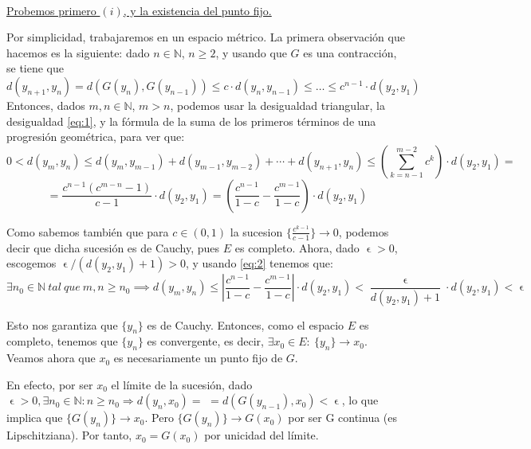 \documentclass[11pt, a4paper, titlepage]{article}
\makeatletter
\let\epsilon\upvarepsilon
\renewenvironment{proof}[1][\proofname] {\vspace{-15pt}\par\pushQED{\qed}\normalfont\topsep6\p@\@plus6\p@\relax\trivlist\item[\hskip\labelsep\it#1\@addpunct{.}]\ignorespaces}{\popQED\endtrivlist\@endpefalse}
\theoremstyle{theorem-style}
\theoremstyle{definition-style}
\theoremstyle{remark-style}
\theoremstyle{example-style}
\makeatother
\begin{document}
\begin{proof} \hfill \\
\underline{Probemos primero $(i)$, y la existencia del punto fijo.} 

Por simplicidad, trabajaremos en un espacio métrico. La primera observación que hacemos es la siguiente: dado $n \in \mathbb{N}$, $n \ge 2$, y usando que $G$ es una contracción, se tiene que
\begin{equation} \label{eq:1} \tag{$\ast$}
d(y_{n+1}, y_{n}) = d(G(y_{n}), G(y_{n-1})) \le c\cdot d(y_{n}, y_{n-1}) \le \dots \le c^{n-1}\cdot d(y_{2}, y_{1})
\end{equation}
Entonces, dados $m,n \in \mathbb{N}$, $m > n$, podemos usar la desigualdad triangular, la desigualdad \eqref{eq:1}, y la fórmula de la suma de los primeros términos de una progresión geométrica, para ver que:
$$0 < d(y_{m}, y_{n}) \leq d(y_m,y_{m-1}) + d(y_{m-1},y_{m-2}) + \cdots + d(y_ {n+1},y_{n})  \leq \left( \sum_{k=n-1}^{m-2}c^k \right) \cdot d(y_2,y_1) = $$ 
\begin{equation} \label{eq:2} \tag{$\ast \ast$}
= \frac{c^{n-1}(c^{m-n} - 1)}{c-1} \cdot d(y_2,y_1) = \left( \frac{c^{n-1}}{1-c} - \frac{c^{m-1}}{1-c} \right) \cdot d(y_2,y_1)
\end{equation}

Como sabemos también que para $c \in (0,1)$ la sucesion $\{\frac{c^{k-1}}{c-1}\} \rightarrow 0$, podemos decir que dicha sucesión es de Cauchy, pues $E$ es completo. Ahora, dado $\epsilon > 0$, escogemos $\epsilon / (d(y_2,y_1) + 1) > 0$, y usando \eqref{eq:2} tenemos que: $$ \exists n_{0} \in \mathbb{N} \ tal\ que\ m,n\geq n_{0} \implies d(y_{m}, y_{n}) \leq \left| \frac{c^{n-1}}{1-c} - \frac{c^{m-1}}{1-c} \right| \cdot d(y_2,y_1) < \frac{\epsilon}{d(y_2,y_1) + 1} \cdot d(y_2,y_1) < \epsilon $$ 

Esto nos garantiza que $\{y_{n}\}$ es de Cauchy. Entonces, como el espacio $E$ es completo, tenemos que $\{y_n\}$ es convergente, es decir, $\exists x_0 \in E:\ \{y_{n}\}\rightarrow x_0$. Veamos ahora que $x_0$ es necesariamente un punto fijo de $G$.

En efecto, por ser $x_0$ el límite de la sucesión, dado $\epsilon > 0, \exists n_0 \in \mathbb{N}: n \ge n_0 \Rightarrow d(y_n, x_0) =$ $= d(G(y_{n-1}),x_0) <  \epsilon$, lo que implica que $\{G(y_{n})\}\rightarrow x_0$. Pero $\{G(y_{n})\}\rightarrow G(x_0)$ por ser G continua (es Lipschitziana). Por tanto, $x_0 = G(x_0)$ por unicidad del límite.
\vspace{0.5em}


\end{proof}
\end{document}
